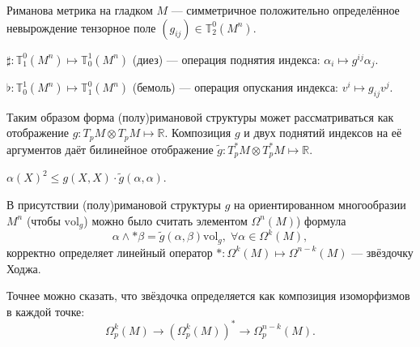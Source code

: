  \begin{to_def}
 	Риманова метрика на гладком $M$ --- симметричное положительно определённое невырождение тензорное поле $(g_{i j}) \in \mathbb{T}_2^0(M^n)$. 
 \end{to_def}

 \begin{to_def}
 	$\sharp \colon \mathbb{T}_1^0(M^n) \mapsto \mathbb{T}_0^1(M^n)$ (диез) --- операция поднятия индекса: $\alpha_i \mapsto g^{i j} \alpha_j$.
 \end{to_def}

 \begin{to_def}
 	$\flat \colon \mathbb{T}^1_0(M^n) \mapsto \mathbb{T}^0_1(M^n)$ (бемоль) --- операция опускания индекса: $v^i \mapsto g_{i j}v^j$.
 \end{to_def}

Таким образом форма (полу)римановой структуры может рассматриваться как отображение $g\colon T_pM \otimes T_pM \mapsto \mathbb{R}$.
Композиция $g$ и двух поднятий индексов на её аргументов даёт билинейное отображение $\tilde{g}\colon T_p^*M \otimes T_p^*M \mapsto \mathbb{R}$. 

\begin{to_tas}
	$\alpha(X)^2 \leq g(X,X) \cdot \tilde{g} (\alpha,\alpha)$.
\end{to_tas}

\begin{to_def}
	В присутствии (полу)римановой структуры $g$ на ориентированном многообразии $M^n$ (чтобы $\text{vol}_{g}$) можно было считать элементом $\Omega^n(M)$) формула 
	\begin{equation*}
		\alpha \wedge *\beta = \tilde{g}(\alpha,\beta) \text{vol}_g, \; \forall \alpha \in \Omega^k(M),	
	\end{equation*}
	корректно определяет линейный оператор $*\colon \Omega^k(M) \mapsto \Omega^{n-k}(M)$ --- звёздочку Ходжа.

	Точнее можно сказать, что звёздочка определяется как композиция изоморфизмов в каждой точке:
	\begin{equation*}
		\Omega_p^k(M) \longrightarrow \left(\Omega_p^k(M)\right)^* \longrightarrow \Omega_p^{n-k}(M).
	\end{equation*}
\end{to_def}